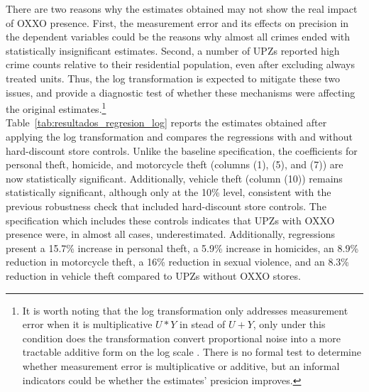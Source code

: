 \documentclass[12pt]{article}
\begin{document}
There are two reasons why the estimates obtained may not show the real impact of OXXO presence.  First, the measurement error and its effects on precision in the dependent variables could be the reasons why almost all crimes ended with statistically insignificant estimates. Second, a number of UPZs reported high crime counts relative to their residential population, even after excluding always treated units. Thus, the log transformation is expected to mitigate these two issues, and provide a diagnostic test of whether these mechanisms were affecting the original estimates.\footnote{It is worth noting that the log transformation only addresses measurement error when it is multiplicative $U * Y$ in stead of $U + Y$, only under this condition does the transformation convert proportional noise into a more tractable additive form on the log scale \parencite{pinasanchez2022impact, wooldridge2010econometric}. There is no formal test to determine whether measurement error is multiplicative or additive, but an informal indicators could be whether the estimates' presicion improves.}\\

Table~\ref{tab:resultados_regresion_log} reports the estimates obtained after applying the log transformation and compares the regressions with and without hard-discount store controls. Unlike the baseline specification, the coefficients for personal theft, homicide, and motorcycle theft (columns (1), (5), and (7)) are now statistically significant. Additionally, vehicle theft (column (10)) remains statistically significant, although only at the 10\% level, consistent with the previous robustness check that included hard-discount store controls. The specification which includes these controls indicates that UPZs with OXXO presence were, in almost all cases, underestimated. Additionally, regressions present a 15.7\% increase in personal theft, a 5.9\% increase in homicides, an 8.9\% reduction in motorcycle theft, a 16\% reduction in sexual violence, and an 8.3\% reduction in vehicle theft compared to UPZs without OXXO stores.\\
\end{document}
